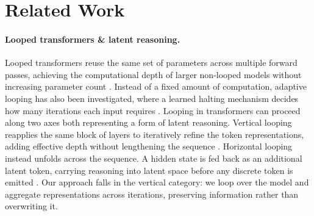 \section{Related Work} 

\paragraph{Looped transformers \& latent reasoning.} Looped transformers reuse the same set of parameters across multiple forward passes, achieving the computational depth of larger non-looped models without increasing parameter count \citep{dehghani2018universal, zeng2026ponderlm}. Instead of a fixed amount of computation, adaptive looping has also been investigated, where a learned halting mechanism decides how many iterations each input requires \citep{banino2021pondernet, zhu2025scaling, frey2026adaptive}.
Looping in transformers can proceed along two axes both representing a form of latent reasoning. Vertical looping reapplies the same block of layers to iteratively refine the token representations, adding effective depth without lengthening the sequence \citep{saunshi2025reasoning}. 
Horizontal looping instead unfolds across the sequence. A hidden state is fed back as an additional latent token, carrying reasoning into latent space before any discrete token is emitted \citep{hao2024training, shen2025codi}. 
Our approach falls in the vertical category: we loop over the model and aggregate representations across iterations, preserving information rather than overwriting it.








